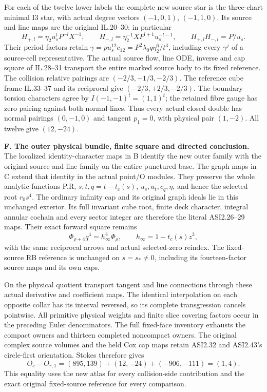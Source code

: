 For each of the twelve lower labels the complete new source star is the
three-chart minimal I3 star, with actual degree vectors
\((-1,0,1)\), \((-1,1,0)\).  Its source and line maps are the original
IL.20--30: in particular
\[
H_{+,l}=\eta_2u_s^lP^{-l}X^{-1},\qquad
H_{-,l}=\eta_2^{-1}XP^{l+1}u_s^{-l-1},\qquad
H_{+,l}H_{-,l}=P/u_s.
\]
Their period factors retain
\(\gamma=pu_s^{12}c_{12}=P^2\lambda_0q\eta_2^6/t^3\), including every
\(\gamma^j\) of a source-cell representative.  The actual source flow,
line ODE, inverse and cap square of IL.28--31 transport the entire marked
source body to its fixed reference.  The collision relative pairings are
\((-2/3,-1/3,-2/3)\).  The reference cube frame IL.33--37 and its
reciprocal give \((-2/3,+2/3,-2/3)\).  The boundary torsion characters
agree by \(I(-1,-1)^t=(1,1)^t\); the retained fibre gauge has zero pairing
against both normal lines.  Thus every actual closed double has normal
pairings \((0,-1,0)\) and tangent \(p_1=0\), with physical pair
\((1,-2)\).  All twelve give \((12,-24)\).

\medskip\noindent\textbf{F. The outer physical bundle, finite square and directed conclusion.}
The localized identity-character maps in B identify the new outer family
with the original source and line family on the entire punctured base.
The graph maps in C extend that identity in the actual point/O modules.
They preserve the whole analytic functions P,R, \(s,t,q=t-t_c(s)\),
\(u_s,u_t,c_q,\eta\), and hence the selected root \(r_0s^4\).
The ordinary infinity cap and its original graph ideals lie in this
unchanged exterior.  Its full invariant cube root, finite deck character,
integral annular cochain and every sector integer are therefore the
literal ASI2.26--29 maps.  Their exact forward square remains
\[
                   \Phi_{\rho+4}q^4=h_\infty^4\Phi_\rho,
                   \qquad h_\infty=1-t_c(s)z^3,
\]
with the same reciprocal arrows and actual selected-zero reindex.
The fixed-source RB reference is unchanged on \(s=s_*\ne0\), including
its fourteen-factor source maps and its own caps.

On the physical quotient transport tangent and line connections through
these actual derivative and coefficient maps.  The identical
interpolation on each opposite collar has its interval reversed, so
its complete transgression cancels pointwise.  All primitive physical
weights and finite slice covering factors occur in the preceding
Euler denominators.  The full fixed-face inventory exhausts the compact
owners and thirteen completed noncompact owners.  The original complex
source volumes and the held Cox cap maps retain ASI2.32 and ASI2.43's
circle-first orientation.  Stokes therefore gives
\[
 O_c-O_{r,1}=(895,139)+(12,-24)+(-906,-111)=(1,4).
\]
This equality uses the new atlas for every collision-side contribution
and the exact original fixed-source reference for every comparison.

